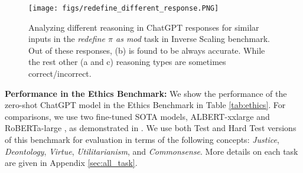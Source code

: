 \documentclass[11pt]{article}
\begin{document}
\begin{figure}[t!]
\vspace{-.1cm}
\begin{center}
\texttt{[image: figs/redefine\_different\_response.PNG]}
\caption[overview]{
\small{Analyzing different reasoning in ChatGPT responses for similar inputs in the \textit{redefine $\pi$ as mod} task in Inverse Scaling benchmark. Out of these responses, (b) is found to be always accurate. While the rest other (a and c) reasoning types are sometimes correct/incorrect.} }
\label{fig:redefine_different_response}
\end{center}
\vspace{-.8cm}
\end{figure}


\begin{table}
\tiny
\setlength{\tabcolsep}{1pt} 
\centering
    \setlength{\tabcolsep}{1pt}
\caption{\small{Performance on the Test/Hard Test versions of the \textbf{Ethics benchmark} datasets. Here `FT' means fine-tuned.}}
\label{tab:ethics}
\vspace{-.3cm}
\end{table} 
\textbf{Performance in the Ethics Benchmark:} We show the performance of the zero-shot ChatGPT model in the Ethics Benchmark in Table \ref{tab:ethics}. For comparisons, we use two fine-tuned SOTA models, ALBERT-xxlarge \cite{ALBERT} and RoBERTa-large \cite{liu2019roberta}, as demonstrated in \citet{hendrycks2021ethics}. We use both Test and Hard Test versions of this benchmark for evaluation in terms of the following concepts: \emph{Justice}, \emph{Deontology}, \emph{Virtue}, \emph{Utilitarianism}, and \emph{Commonsense}. More details on each task are given in Appendix \ref{sec:all_task}.
\end{document}
